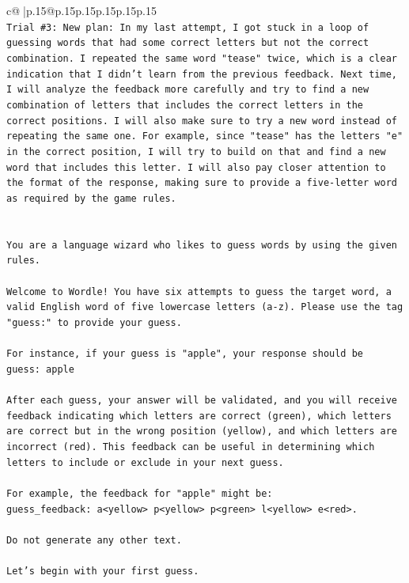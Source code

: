 \documentclass{article}
\begin{document}
{\begin{supertabular}{c@{$\;$}|p{.15\linewidth}@{}p{.15\linewidth}p{.15\linewidth}p{.15\linewidth}p{.15\linewidth}p{.15\linewidth}}
{{{\\ 
\texttt{Trial \#3: New plan: In my last attempt, I got stuck in a loop of guessing words that had some correct letters but not the correct combination. I repeated the same word "tease" twice, which is a clear indication that I didn't learn from the previous feedback. Next time, I will analyze the feedback more carefully and try to find a new combination of letters that includes the correct letters in the correct positions. I will also make sure to try a new word instead of repeating the same one. For example, since "tease" has the letters "e" in the correct position, I will try to build on that and find a new word that includes this letter. I will also pay closer attention to the format of the response, making sure to provide a five{-}letter word as required by the game rules.} \\
\\ 
\\ 
\texttt{You are a language wizard who likes to guess words by using the given rules.} \\
\\ 
\texttt{Welcome to Wordle! You have six attempts to guess the target word, a valid English word of five lowercase letters (a{-}z). Please use the tag "guess:" to provide your guess.} \\
\\ 
\texttt{For instance, if your guess is "apple", your response should be} \\
\texttt{guess: apple} \\
\\ 
\texttt{After each guess, your answer will be validated, and you will receive feedback indicating which letters are correct (green), which letters are correct but in the wrong position (yellow), and which letters are incorrect (red). This feedback can be useful in determining which letters to include or exclude in your next guess.} \\
\\ 
\texttt{For example, the feedback for "apple" might be:} \\
\texttt{guess\_feedback: a<yellow> p<yellow> p<green> l<yellow> e<red>.} \\
\\ 
\texttt{Do not generate any other text.} \\
\\ 
\texttt{Let's begin with your first guess.} \\
            }
        }
    }
     \\ \\


\end{supertabular}}
\end{document}
